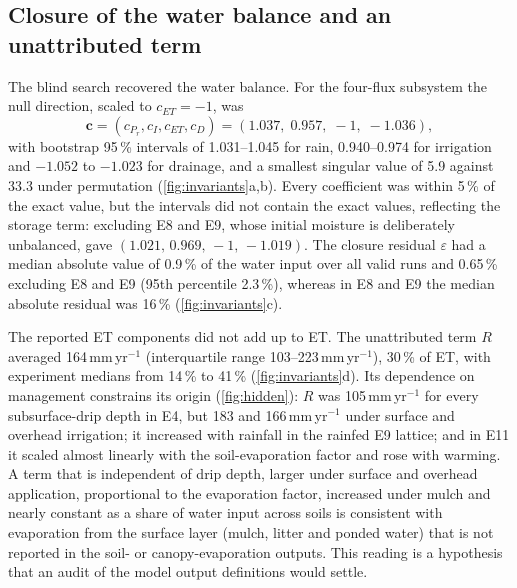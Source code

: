 \documentclass[review,12pt,authoryear]{elsarticle}
\begin{document}
\subsection{Closure of the water balance and an unattributed term}
\label{sec:resultsB}
The blind search recovered the water balance. For the four-flux subsystem the null direction, scaled to $c_{\mathit{ET}}=-1$, was
\begin{equation}
\mathbf c=(c_{P_r},c_I,c_{\mathit{ET}},c_D)=(1.037,\;0.957,\;-1,\;-1.036),
\label{eq:law}
\end{equation}
with bootstrap 95\,\% intervals of 1.031--1.045 for rain, 0.940--0.974 for irrigation and $-1.052$ to $-1.023$ for drainage, and a smallest singular value of 5.9 against 33.3 under permutation (\cref{fig:invariants}a,b). Every coefficient was within 5\,\% of the exact value, but the intervals did not contain the exact values, reflecting the storage term: excluding E8 and E9, whose initial moisture is deliberately unbalanced, gave $(1.021,\,0.969,\,-1,\,-1.019)$. The closure residual $\varepsilon$ had a median absolute value of 0.9\,\% of the water input over all valid runs and 0.65\,\% excluding E8 and E9 (95th percentile 2.3\,\%), whereas in E8 and E9 the median absolute residual was 16\,\% (\cref{fig:invariants}c).

The reported ET components did not add up to ET. The unattributed term $R$ averaged 164\,mm\,yr$^{-1}$ (interquartile range 103--223\,mm\,yr$^{-1}$), 30\,\% of ET, with experiment medians from 14\,\% to 41\,\% (\cref{fig:invariants}d). Its dependence on management constrains its origin (\cref{fig:hidden}): $R$ was 105\,mm\,yr$^{-1}$ for every subsurface-drip depth in E4, but 183 and 166\,mm\,yr$^{-1}$ under surface and overhead irrigation; it increased with rainfall in the rainfed E9 lattice; and in E11 it scaled almost linearly with the soil-evaporation factor and rose with warming. A term that is independent of drip depth, larger under surface and overhead application, proportional to the evaporation factor, increased under mulch and nearly constant as a share of water input across soils is consistent with evaporation from the surface layer (mulch, litter and ponded water) that is not reported in the soil- or canopy-evaporation outputs. This reading is a hypothesis that an audit of the model output definitions would settle.
\end{document}
